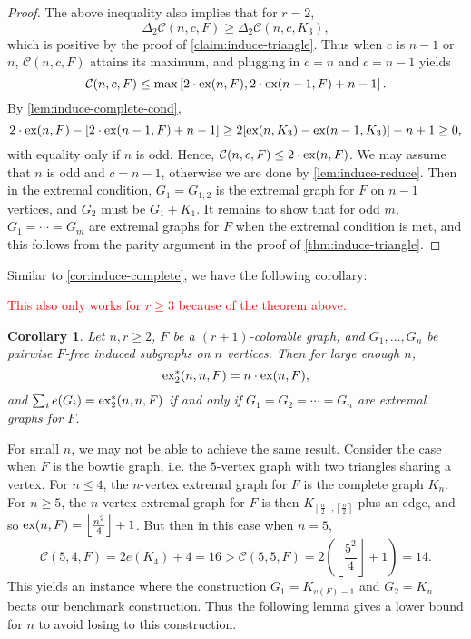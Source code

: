 \documentclass[12pt]{report}
\newtheorem{corollary}[theorem]{Corollary}
\newcommand*{\ex}{\textnormal{ex}}
\newcommand*{\dex}{\textnormal{ex}_2}
\newcommand*{\con}{\mathcal{C}}
\begin{document}
\begin{proof}
  The above inequality also implies that for $r = 2$,
  \[
    \Delta_2 \con(n, c, F) \geq \Delta_2 \con(n, c, K_3),
  \]
  which is positive by the proof of \cref{claim:induce-triangle}. Thus when $c$ is $n - 1$ or $n$, $\con(n, c, F)$ attains its maximum, and plugging in $c = n$ and $c = n -1$ yields 
  \[
    \con(n, c, F) \leq \max\left[2 \cdot \ex(n, F), 2 \cdot \ex(n - 1, F) + n - 1\right].
  \]
  By \cref{lem:induce-complete-cond},
  \[
    2 \cdot \ex(n, F) - [2 \cdot \ex(n - 1, F) + n - 1] \geq 2[\ex(n, K_{3}) - \ex(n - 1, K_{3})] - n + 1 \geq 0,
  \]
  with equality only if $n$ is odd. Hence, $\con(n, c, F) \leq 2 \cdot \ex(n, F)$. We may assume that $n$ is odd and $c = n - 1$, otherwise we are done by \cref{lem:induce-reduce}. Then in the extremal condition, $G_1 = G_{1, 2}$ is the extremal graph for $F$ on $n - 1$ vertices, and $G_2$ must be $G_1 + K_1$. It remains to show that for odd $m$, $G_1 = \cdots = G_m$ are extremal graphs for $F$ when the extremal condition is met, and this follows from the parity argument in the proof of \cref{thm:induce-triangle}.
\end{proof}

Similar to \cref{cor:induce-complete}, we have the following corollary:

\textcolor{red}{This also only works for $r \geq 3$ because of the theorem above.}

\begin{corollary}
  Let $n , r \geq 2$, $F$ be a $(r + 1)$-colorable graph, and $G_1, \ldots, G_n$ be pairwise $F$-free induced subgraphs on $n$ vertices. Then for large enough $n$,
  \[
    \dex^*(n, n, F) = n \cdot \ex(n, F),
  \]
  and $\sum_i e(G_i) = \dex^*(n, n, F)$ if and only if $G_1 = G_2 = \cdots = G_n$ are extremal graphs for $F$.
\end{corollary}

For small $n$, we may not be able to achieve the same result. Consider the case when $F$ is the bowtie graph, i.e. the $5$-vertex graph with two triangles sharing a vertex. For $n \leq 4$, the $n$-vertex extremal graph for $F$ is the complete graph $K_n$. For $n \geq 5$, the $n$-vertex extremal graph for $F$ is then $K_{\left\lfloor\frac{n}{2}\right\rfloor, \left\lceil\frac{n}{2}\right\rceil}$ plus an edge, and so $\ex(n, F) = \left\lfloor\frac{n^2}{4}\right\rfloor + 1$. But then in this case when $n = 5$, 
\[
  \con(5, 4, F) = 2e(K_4) + 4 = 16 > \con(5, 5, F) = 2\left(\left\lfloor\frac{5^2}{4}\right\rfloor + 1\right) = 14.
\]
This yields an instance where the construction $G_1 = K_{v(F) - 1}$ and $G_2 = K_n$ beats our benchmark construction. Thus the following lemma gives a lower bound for $n$ to avoid losing to this construction.
\end{document}
